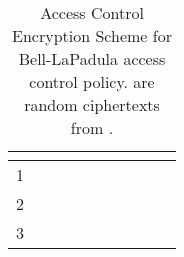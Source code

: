 \documentclass{llncs}
\begin{document}
\renewcommand{\oneACE}{}
\renewcommand{\oneACEpow}{{}}
\begin{table}
\centering
\begin{tabular}{l|l|ccc|ccccc}
		&	\multicolumn{1}{|c|}{}	
		&	\multicolumn{3}{|c}{}	
		&	\multicolumn{5}{|c}{}		\\ \hline
		
1		&							
		&		
&&&	&&&& \\
		
2		&					
		&&		
&&	&&&& \\
		
3		&				
		&&&		
&	&&&& \\
\end{tabular}
\newline
\caption{Access Control Encryption Scheme for Bell-LaPadula access control policy.  are random ciphertexts from .}
\label{table:BL_ACE}
\end{table}
\renewcommand{\oneACE}{\mathsf{1ACE}}
\renewcommand{\oneACEpow}{\mathsf{1ACE}}
\end{document}
